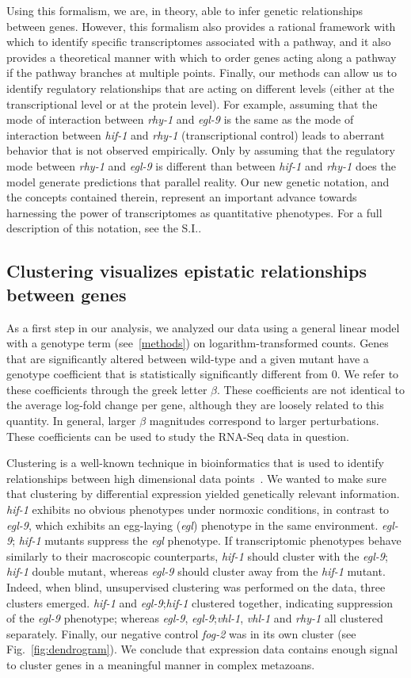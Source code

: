 \documentclass[9pt,twocolumn,twoside]{pnas-new}
\newcommand{\egl}{\emph{egl-9}}
\newcommand{\rhy}{\emph{rhy-1}}
\newcommand{\vhl}{\emph{vhl-1}}
\newcommand{\hif}{\emph{hif-1}}
\newcommand{\fog}{\emph{fog-2}}
\begin{document}
Using this formalism, we are, in theory, able to infer genetic relationships
between genes. However, this formalism also provides a rational framework with
which to identify specific transcriptomes associated with a pathway, and it also
provides a theoretical manner with which to order genes acting along a pathway
if the pathway branches at multiple points. Finally, our methods can allow us to
identify regulatory relationships that are acting on different levels (either at
the transcriptional level or at the protein level).
For example, assuming that the mode of interaction between \rhy{} and \egl{} is
the same as the mode of interaction between \hif{} and \rhy{} (transcriptional
control) leads to aberrant behavior that is not observed empirically. Only by
assuming that the regulatory mode between \rhy{} and \egl{} is different than
between \hif{} and \rhy{} does the model generate predictions that parallel
reality. Our new genetic notation, and the concepts contained therein, represent
an important advance towards harnessing the power of transcriptomes as
quantitative phenotypes. For a full description of this notation, see the S.I..

\subsection{Clustering visualizes epistatic relationships between genes}
\label{sub:Clustering}

As a first step in our analysis, we analyzed our data using a general
linear model with a genotype term (see~\ref{methods}) on logarithm-transformed
counts. Genes that are significantly altered between wild-type and a given
mutant have a genotype coefficient that is statistically significantly different
from 0. We refer to these coefficients through the greek letter $\beta$. These
coefficients are not identical to the average log-fold change per gene, although
they are loosely related to this quantity. In general, larger $\beta$ magnitudes
correspond to larger perturbations. These coefficients can be used to study the
RNA-Seq data in question.

Clustering is a well-known technique in bioinformatics that is used to identify
relationships between high dimensional data points~\cite{Yeung2003}. We wanted
to make sure that clustering by differential expression yielded genetically
relevant information. \hif{} exhibits no obvious phenotypes under normoxic
conditions, in contrast to \egl{}, which exhibits an egg-laying (\emph{egl})
phenotype in the same environment. \egl{}; \hif{} mutants suppress the
\emph{egl} phenotype. If transcriptomic phenotypes behave similarly to their
macroscopic counterparts, \hif{} should cluster with the \egl{}; \hif{} double
mutant, whereas \egl{} should cluster away from the \hif{} mutant.
Indeed, when blind, unsupervised clustering was performed on the data, three
clusters emerged. \hif{} and \egl{};\hif{} clustered together, indicating
suppression of the \egl{} phenotype; whereas \egl{}, \egl{};\vhl{}, \vhl{} and
\rhy{} all clustered separately. Finally, our negative control \fog{} was in its
own cluster (see Fig.~\ref{fig:dendrogram}). We conclude that expression data
contains enough signal to cluster genes in a meaningful manner in complex
metazoans.
\end{document}
